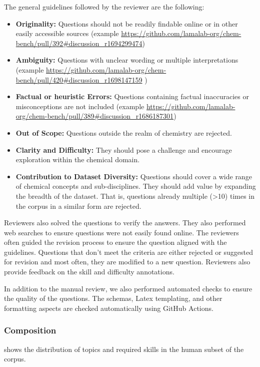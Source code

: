 The general guidelines followed by the reviewer are the following:

\begin{itemize}
    \item \textbf{Originality:} Questions should not be readily findable online or in other easily accessible sources (example \url{https://github.com/lamalab-org/chem-bench/pull/392#discussion_r1694299474})
    \item \textbf{Ambiguity:} Questions with unclear wording or multiple interpretations (example \url{https://github.com/lamalab-org/chem-bench/pull/420#discussion_r1698147159} )
    \item \textbf{Factual or heuristic Errors: }Questions containing factual inaccuracies or misconceptions are not included (example \url{https://github.com/lamalab-org/chem-bench/pull/389#discussion_r1686187301})
    \item \textbf{Out of Scope:} Questions outside the realm of chemistry are rejected.
    \item \textbf{Clarity and Difficulty: } They should pose a challenge and encourage exploration within the chemical domain.
    \item \textbf{Contribution to Dataset Diversity: }Questions should cover a wide range of chemical concepts and sub-disciplines. They should add value by expanding the breadth of the dataset. That is, questions already multiple (>10) times in the corpus in a similar form are rejected.
\end{itemize}

Reviewers also solved the questions to verify the answers. They also performed web searches to ensure questions were not easily found online. The reviewers often guided the revision process to ensure the question aligned with the guidelines. Questions that don't meet the criteria are either rejected or suggested for revision and most often, they are modified to a new question. Reviewers also provide feedback on the skill and difficulty annotations.

In addition to the manual review, we also performed automated checks to ensure the quality of the questions. The schemas, Latex templating, and other formatting aspects are checked automatically using GitHub Actions.

\subsubsection{Composition}

 shows the distribution of topics and required skills in the human subset of the \chembench corpus.

